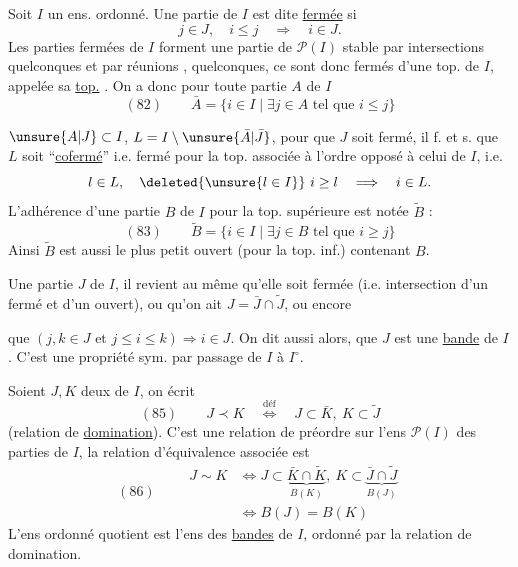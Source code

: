 Soit $I$ un ens. ordonné. Une partie  de $I$ est dite \uline{fermée} si
\[j\in J,\quad i\leq j\quad\Longrightarrow\quad i\in J.\]
Les parties fermées de $I$ forment une  partie de $\mathcal P(I)$ stable par intersections quelconques et par réunions , quelconques, ce sont donc   fermés d'une top. de $I$, appelée sa \uline{top.}  . On a donc pour toute partie $A$ de $I$
\[
(82)\qquad\bar A=\{i\in I\mid\exists j\in A\text{ tel que }i\leq j\}
\]

 $\unsure{A|J}\subset I$, $L=I\setminus\unsure{\bar A|\bar J}$, pour que $J$ soit fermé,  il f. et s. que $L$ soit ``\uline{cofermé}'' i.e. fermé pour la top. associée à l'ordre opposé à  celui de $I$, i.e.
\[l\in L,\quad\deleted{\unsure{l\in I}}\ i\geq l\quad\Longrightarrow\quad i\in L.\]
L'adhérence d'une partie $B$ de $I$ pour la top. supérieure est notée $\widetilde B$ :
\[
(83)\qquad\widetilde B=\{i\in I\mid\exists j\in B\text{ tel que }i\geq j\}
\]
 Ainsi $\widetilde B$ est aussi le plus petit ouvert (pour la top. inf.) contenant $B$.

 Une partie $J$ de $I$, il revient au même qu'elle soit  fermée (i.e. intersection d'un fermé et d'un ouvert), ou qu'on ait $J=\bar J\cap\widetilde J$, ou encore

que  $(j,k\in J\text{ et }j\leq i\leq k)\Longrightarrow i\in J$. On dit aussi alors, que $J$ est une \uline{bande} de $I$. C'est  une propriété sym. par passage de $I$ à $I^\circ$.

Soient $J,K$ deux   de $I$, on écrit
\[
(85)\qquad J\prec K\quad\overset{\mathrm{déf}}{\Longleftrightarrow}\quad J\subset\bar K,\ K\subset\widetilde J
\]
(relation de \uline{domination}). C'est une relation de préordre sur l'ens $\mathcal P(I)$ des parties de $I$, la relation d'équivalence associée est
\[
(86)\qquad\begin{aligned}
J\sim K&\Longleftrightarrow J\subset\underbrace{\bar K\cap\widetilde K}_{B(K)},\ K\subset\underbrace{\bar J\cap\widetilde J}_{B(J)}\\
&\Longleftrightarrow B(J)=B(K)
\end{aligned}
\]
L'ens ordonné quotient est l'ens des \uline{bandes} de $I$, ordonné par la relation de  domination.

